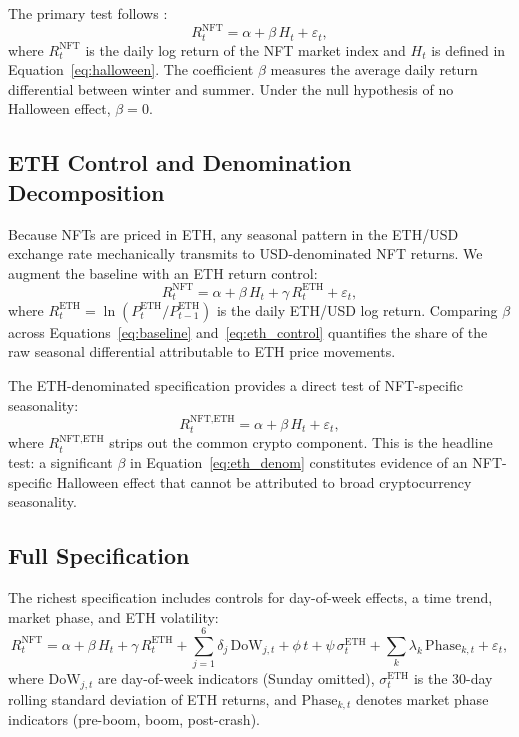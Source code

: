 \documentclass[12pt,a4paper]{article}
\begin{document}
The primary test follows \citet{BoumanJacobsen2002}:
\begin{equation}\label{eq:baseline}
R_t^{\text{NFT}} = \alpha + \beta \, H_t + \varepsilon_t,
\end{equation}
where $R_t^{\text{NFT}}$ is the daily log return of the NFT market index and $H_t$ is defined in Equation~\eqref{eq:halloween}. The coefficient $\beta$ measures the average daily return differential between winter and summer. Under the null hypothesis of no Halloween effect, $\beta = 0$.

\subsection{ETH Control and Denomination Decomposition}

Because NFTs are priced in ETH, any seasonal pattern in the ETH/USD exchange rate mechanically transmits to USD-denominated NFT returns. We augment the baseline with an ETH return control:
\begin{equation}\label{eq:eth_control}
R_t^{\text{NFT}} = \alpha + \beta \, H_t + \gamma \, R_t^{\text{ETH}} + \varepsilon_t,
\end{equation}
where $R_t^{\text{ETH}} = \ln(P_t^{\text{ETH}} / P_{t-1}^{\text{ETH}})$ is the daily ETH/USD log return. Comparing $\beta$ across Equations~\eqref{eq:baseline} and~\eqref{eq:eth_control} quantifies the share of the raw seasonal differential attributable to ETH price movements.

The ETH-denominated specification provides a direct test of NFT-specific seasonality:
\begin{equation}\label{eq:eth_denom}
R_t^{\text{NFT,ETH}} = \alpha + \beta \, H_t + \varepsilon_t,
\end{equation}
where $R_t^{\text{NFT,ETH}}$ strips out the common crypto component. This is the headline test: a significant $\beta$ in Equation~\eqref{eq:eth_denom} constitutes evidence of an NFT-specific Halloween effect that cannot be attributed to broad cryptocurrency seasonality.

\subsection{Full Specification}

The richest specification includes controls for day-of-week effects, a time trend, market phase, and ETH volatility:
\begin{equation}\label{eq:full}
R_t^{\text{NFT}} = \alpha + \beta \, H_t + \gamma \, R_t^{\text{ETH}} + \sum_{j=1}^{6} \delta_j \, \text{DoW}_{j,t} + \phi \, t + \psi \, \sigma_t^{\text{ETH}} + \sum_{k} \lambda_k \, \text{Phase}_{k,t} + \varepsilon_t,
\end{equation}
where $\text{DoW}_{j,t}$ are day-of-week indicators (Sunday omitted), $\sigma_t^{\text{ETH}}$ is the 30-day rolling standard deviation of ETH returns, and $\text{Phase}_{k,t}$ denotes market phase indicators (pre-boom, boom, post-crash).
\end{document}
